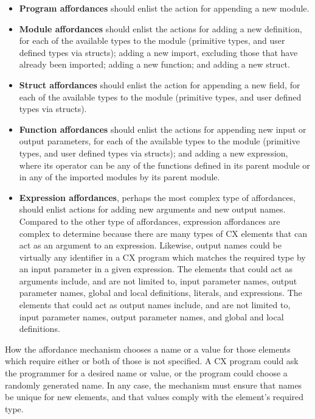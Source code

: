 \begin{itemize}
\item \textbf{Program affordances} should enlist the action for
  appending a new module.
\item \textbf{Module affordances} should enlist the actions for adding
  a new definition, for each of the available types to the module
  (primitive types, and user defined types via structs); adding a new
  import, excluding those that have already been imported; adding a
  new function; and adding a new struct.
\item \textbf{Struct affordances} should enlist the action for
  appending a new field, for each of the available types to the module
  (primitive types, and user defined types via structs).
\item \textbf{Function affordances} should enlist the actions for
  appending new input or output parameters, for each of the available
  types to the module (primitive types, and user defined types via
  structs); and adding a new expression, where its operator can be any
  of the functions defined in its parent module or in any of the
  imported modules by its parent module.
\item \textbf{Expression affordances}, perhaps the most complex type
  of affordances, should enlist actions for adding new arguments and
  new output names. Compared to the other type of affordances,
  expression affordances are complex to determine because there are
  many types of CX elements that can act as an argument to an
  expression. Likewise, output names could be virtually any identifier
  in a CX program which matches the required type by an input
  parameter in a given expression. The elements that could act as
  arguments include, and are not limited to, input parameter names,
  output parameter names, global and local definitions, literals, and
  expressions. The elements that could act as output names include,
  and are not limited to, input parameter names, output parameter
  names, and global and local definitions.

\end{itemize}

How the affordance mechanism chooses a name or a value for those
elements which require either or both of those is not specified. A CX
program could ask the programmer for a desired name or value, or the
program could choose a randomly generated name. In any case, the
mechanism must ensure that names be unique for new elements, and that
values comply with the element's required type.

